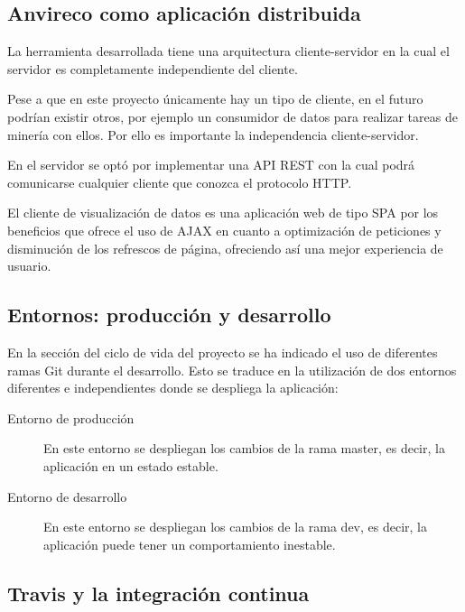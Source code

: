 \subsection{Anvireco como aplicación distribuida}

La herramienta desarrollada tiene una arquitectura cliente-servidor en la cual el servidor es completamente independiente del cliente.

Pese a que en este proyecto únicamente hay un tipo de cliente, en el futuro podrían existir otros, por ejemplo un consumidor de datos para realizar tareas de minería con ellos. Por ello es importante la independencia cliente-servidor.


En el servidor se optó por implementar una API REST con la cual podrá comunicarse cualquier cliente que conozca el protocolo HTTP.

El cliente de visualización de datos es una aplicación web de tipo SPA por los beneficios que ofrece el uso de AJAX en cuanto a optimización de peticiones y disminución de los refrescos de página, ofreciendo así una mejor experiencia de usuario.


\subsection{Entornos: producción y desarrollo}

En la sección del ciclo de vida del proyecto se ha indicado el uso de diferentes ramas Git durante el desarrollo. Esto se traduce en la utilización de dos entornos diferentes e independientes donde se despliega la aplicación:

\begin{description}
	\item[Entorno de producción] En este entorno se despliegan los cambios de la rama master, es decir, la aplicación en un estado estable.
	\item[Entorno de desarrollo] En este entorno se despliegan los cambios de la rama dev, es decir, la aplicación puede tener un comportamiento inestable.
\end{description}



\subsection{Travis y la integración continua}

